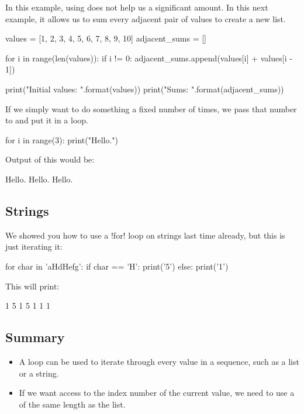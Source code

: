 \documentclass[11pt]{cselabheader}
\begin{document}
In this example, using  does not help us a significant amount.
In this next example, it allows us to sum every adjacent pair of values to
create a new list.

\begin{python3code}
values = [1, 2, 3, 4, 5, 6, 7, 8, 9, 10]
adjacent_sums = []

for i in range(len(values)):
    if i != 0:
        adjacent_sums.append(values[i] + values[i - 1])

print("Initial values: {}".format(values))
print("Sums: {}".format(adjacent_sums))
\end{python3code}

If we simply want to do something a fixed number of times, we pass that number
to  and put it in a loop.

\begin{python3code}
for i in range(3):
    print("Hello.")
\end{python3code}

Output of this would be:

\begin{verbatimcode}
Hello.
Hello.
Hello.
\end{verbatimcode}

\subsection{Strings}

We showed you how to use a \pythoninline!for! loop on strings last time already,
but this is just iterating it:

\begin{python3code}
for char in 'aHdHefg':
    if char == 'H':
        print('5')
    else:
        print('1')
\end{python3code}

This will print:

\begin{verbatimcode}
1
5
1
5
1
1
1
\end{verbatimcode}

\subsection{Summary}
\begin{itemize}
  \item A  loop can be used to iterate through every value in a
    sequence, such as a list or a string.
  \item If we want access to the index number of the current value, we need to
    use a  of the same length as the list.
\end{itemize}
\end{document}
